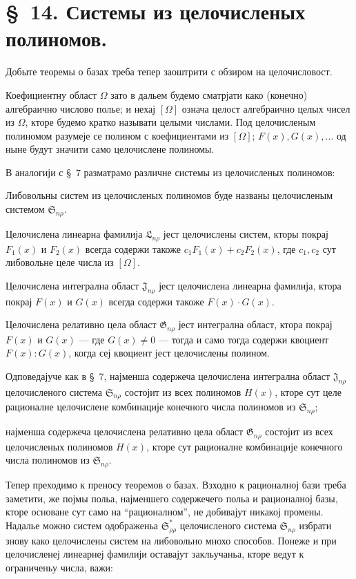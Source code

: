 ﻿\documentclass[11pt]{article}
\providecommand{\Ssys}{\mathfrak{S}}
\providecommand{\Jdom}{\mathfrak{J}}
\providecommand{\Gdom}{\mathfrak{G}}
\providecommand{\Lsys}{\mathfrak{L}}
\begin{document}
\section*{\S\ 14. Системы из целочисленых полиномов.}

Добыте теоремы о базах треба тепер заоштрити с обзиром на целочисловост.

Коефициентну област $\Omega$ зато в дальем будемо сматрјати како (конечно) алгебраично числово полье; и нехај $[\Omega]$ означа целост алгебраично целых чисел из $\Omega$, кторе будемо кратко называти целыми числами. Под целочисленым полиномом разумеје се полином с коефициентами из $[\Omega]$; $F(x),G(x),\ldots$ од ныне будут значити само целочислене полиномы.

В аналогији с \S\ 7 разматрамо различне системы из целочисленых полиномов:

Либовольны систем из целочисленых полиномов буде названы целочисленым системом $\Ssys_{n\rho}$.

Целочислена линеарна фамилија $\Lsys_{n\rho}$ јест целочислены систем, кторы покрај $F_1(x)$ и $F_2(x)$ всегда содержи такоже $c_1F_1(x)+c_2F_2(x)$, где $c_1,c_2$ сут либовольне целе числа из $[\Omega]$.

Целочислена интегрална област $\Jdom_{n\rho}$ јест целочислена линеарна фамилија, ктора покрај $F(x)$ и $G(x)$ всегда содержи такоже $F(x)\cdot G(x)$.

Целочислена релативно цела област $\Gdom_{n\rho}$ јест интегрална област, ктора покрај $F(x)$ и $G(x)$ --- где $G(x)\ne0$ --- тогда и само тогда содержи квоциент $F(x):G(x)$, когда сеј квоциент јест целочислены полином.

Одповедајуче как в \S\ 7, најменша содержеча целочислена интегрална област $\Jdom_{n\rho}$ целочисленого система $\Ssys_{n\rho}$ состојит из всех полиномов $H(x)$, кторе сут целе рационалне целочислене комбинације конечного числа полиномов из $\Ssys_{n\rho}$;

најменша содержеча целочислена релативно цела област $\Gdom_{n\rho}$ состојит из всех целочисленых полиномов $H(x)$, кторе сут рационалне комбинације конечного числа полиномов из $\Ssys_{n\rho}$.

Тепер преходимо к преносу теоремов о базах. Взходно к рационалној бази треба заметити, же појмы польа, најменшего содержечего польа и рационалној базы, кторе основане сут само на ``рационалном'', не добивајут никакој промены. Надалье можно систем одображеньа $\Ssys^*_{\rho\rho}$ целочисленого система $\Ssys_{n\rho}$ избрати знову како целочислены систем на либовольно мнохо способов. Понеже и при целочисленеј линеарнеј фамилији оставајут закльучаньа, кторе ведут к ограниченьу числа, важи:
\end{document}
